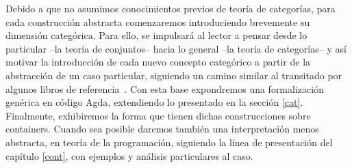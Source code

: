 Debido a que no asumimos conocimientos previos de teoría de categorías, para cada construcción abstracta comenzaremos introduciendo brevemente su dimensión categórica. Para ello, se impulsará al lector a pensar desde lo particular --la teoría de conjuntos-- hacia lo general --la teoría de categorías-- y así motivar la introducción de cada nuevo concepto categórico a partir de la abstracción de un caso particular, siguiendo un camino similar al transitado por algunos libros de referencia~\cite{Awodey,BarrWells}.   
Con esta base expondremos una formalización genérica en código Agda, extendiendo lo presentado en la sección \ref{cat}. 
Finalmente, exhibiremos la forma que tienen dichas construcciones sobre containers. Cuando sea posible daremos también una interpretación menos abstracta, en teoría de la programación, siguiendo la línea de presentación del capítulo \ref{cont}, con ejemplos y análisis particulares al caso.

